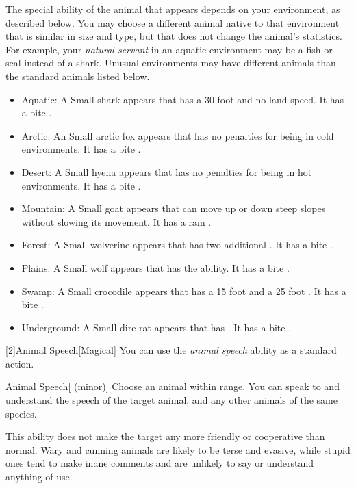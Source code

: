         The special ability of the animal that appears depends on your environment, as described below.
        You may choose a different animal native to that environment that is similar in size and type, but that does not change the animal's statistics.
        For example, your \textit{natural servant} in an aquatic environment may be a fish or seal instead of a shark.
        Unusual environments may have different animals than the standard animals listed below.
        \begin{itemize}
            \item Aquatic: A Small shark appears that has a 30 foot  and no land speed.
                It has a bite .
            \item Arctic: An Small arctic fox appears that has no penalties for being in cold environments.
                It has a bite .
            \item Desert: A Small hyena appears that has no penalties for being in hot environments.
                It has a bite .
            \item Mountain: A Small goat appears that can move up or down steep slopes without slowing its movement.
                It has a ram .
            \item Forest: A Small wolverine appears that has two additional .
                It has a bite .
            \item Plains: A Small wolf appears that has the  ability.
                It has a bite .
            \item Swamp: A Small crocodile appears that has a 15 foot  and a 25 foot .
                It has a bite .
            \item Underground: A Small dire rat appears that has .
                It has a bite .
        \end{itemize}

        [2]{Animal Speech}[Magical] You can use the \textit{animal speech} ability as a standard action.
        \begin{attuneability}{Animal Speech}[ (minor)]
            Choose an animal within \rnglong range.
            You can speak to and understand the speech of the target animal, and any other animals of the same species.

            This ability does not make the target any more friendly or cooperative than normal.
            Wary and cunning animals are likely to be terse and evasive, while stupid ones tend to make inane comments and are unlikely to say or understand anything of use.
        \end{attuneability}

